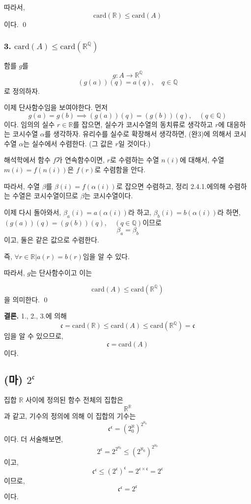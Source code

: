 \documentclass{article}
\begin{document}
따라서, $$\text{card}(\mathbb{R}) \le \text{card}(A)$$이다. \qed

\subsubsection{3. $\text{card}(A) \le \text{card}(\mathbb{R}^{\mathbb{Q}})$}
함를 $g$를
$$g : A \rightarrow \mathbb{R}^{\mathbb{Q}}$$
$$(g(a))(q) = a(q), \quad q \in \mathbb{Q}$$로 정의하자.

이제 단사함수임을 보여야한다.
먼저 $$g(a) = g(b) \implies (g(a))(q) = (g(b))(q), \quad (q \in \mathbb{Q})$$이다.
임의의 실수 $r \in \mathbb{R}$를 잡으면, 실수가 코시수열의 동치류로 생각하고 $r$에 대응하는 코시수열 $\alpha$를 생각하자. 유리수를 실수로 확장해서 생각하면, (완3)에 의해서 코시수열 $\alpha$는 실수에서 수렴한다. (그 값은 $r$일 것이다.)

해석학에서 함수 $f$가 연속함수이면, $r$로 수렴하는 수열 $n(i)$에 대해서, 수열 $m(i) = f(n(i))$은 $f(r)$로 수렴함을 안다.

따라서, 수열 $\beta$를 $\beta(i) = f(\alpha(i))$로 잡으면 수렴하고, 정리 2.4.1.에의해 수렴하는 수열은 코시수열이므로 $\beta$는 코시수열이다.

이제 다시 돌아와서, $\beta_a(i) = a(\alpha(i))$라 하고, $\beta_b(i) = b(\alpha(i))$라 하면, $(g(a))(q) = (g(b))(q), \quad (q \in \mathbb{Q})$이므로 $$\beta_a = \beta_b$$이고, 둘은 같은 값으로 수렴한다. 

즉, $\forall r \in \mathbb{R} \bigg| a(r) = b(r)$임을 알 수 있다.

따라서, $g$는 단사함수이고 이는

 $$\text{card}(A) \le \text{card}(\mathbb{R}^{\mathbb{Q}})$$을 의미한다. \qed

\textbf{결론.} 1., 2., 3.에 의해
$$\mathfrak{c} = \text{card}(\mathbb{R}) \le \text{card}(A) \le \text{card}(\mathbb{R}^{\mathbb{Q}}) = \mathfrak{c}$$임을 알 수 있으므로,
$$\mathfrak{c} = \text{card}(A)$$이다.

\subsection{(마) $2^{\mathfrak{c}}$}
집합 $\mathbb{R}$ 사이에 정의된 함수 전체의 집합은
$$\mathbb{R}^\mathbb{R}$$과 같고, 기수의 정의에 의해 이 집합의 기수는
$$\mathfrak{c}^{\mathfrak{c}} = \left(2^\aleph_0  \right) ^ { 2^{\aleph_0}}$$이다. 더 서술해보면,
$$2 ^ {\mathfrak{c}} = 2 ^ { 2^{\aleph_0}} \le \left(2^{\aleph_0}  \right) ^ { 2^{\aleph_0}} $$이고,
$$\mathfrak{c} ^ {\mathfrak{c}} \le (2^{\mathfrak{c}}) ^ {\mathfrak{c}} = 2^{{\mathfrak{c}} \times {\mathfrak{c}}} = 2^{\mathfrak{c}}$$
이므로,
$$\mathfrak{c} ^ {\mathfrak{c}} = 2^{\mathfrak{c}}$$이다.
\end{document}

